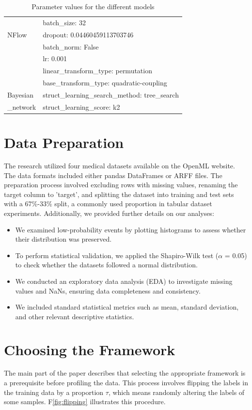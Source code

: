 \documentclass{article}
\theoremstyle{plain}
\theoremstyle{definition}
\theoremstyle{remark}
\begin{document}
\begin{table}[ht!]
\begin{tabular}{l|l}
&batch\_size: 32\\
NFlow &dropout: 0.04460459113703746\\
&batch\_norm: False\\
&lr: 0.001\\
&linear\_transform\_type: permutation\\
&base\_transform\_type: quadratic-coupling\\
\bottomrule
Bayesian&struct\_learning\_search\_method: tree\_search\\
\_network&struct\_learning\_score: k2
\end{tabular}
\caption{Parameter values for the different models}
\label{tab:parameters}
\end{table}

\section{Data Preparation}

The research utilized four medical datasets available on the OpenML website. The data formats included either pandas DataFrames or ARFF files. The preparation process involved excluding rows with missing values, renaming the target column to 'target', and splitting the dataset into training and test sets with a 67\%-33\% split, a commonly used proportion in tabular dataset experiments. Additionally, we provided further details on our analyses:

\begin{itemize}
    \item We examined low-probability events by plotting histograms to assess whether their distribution was preserved.
    \item To perform statistical validation, we applied the Shapiro-Wilk test ($\alpha$ = 0.05) to check whether the datasets followed a normal distribution.
    \item We conducted an exploratory data analysis (EDA) to investigate missing values and NaNs, ensuring data completeness and consistency.
    \item We included standard statistical metrics such as mean, standard deviation, and other relevant descriptive statistics.
\end{itemize}




\section{Choosing the Framework}\label{appsec:choosingframework}
The main part of the paper describes that selecting the appropriate framework is a prerequisite before profiling the data. This process involves flipping the labels in the training data by a proportion $\tau$, which means randomly altering the labels of some samples. F\ref{fig:flipping} illustrates this procedure.
\end{document}
